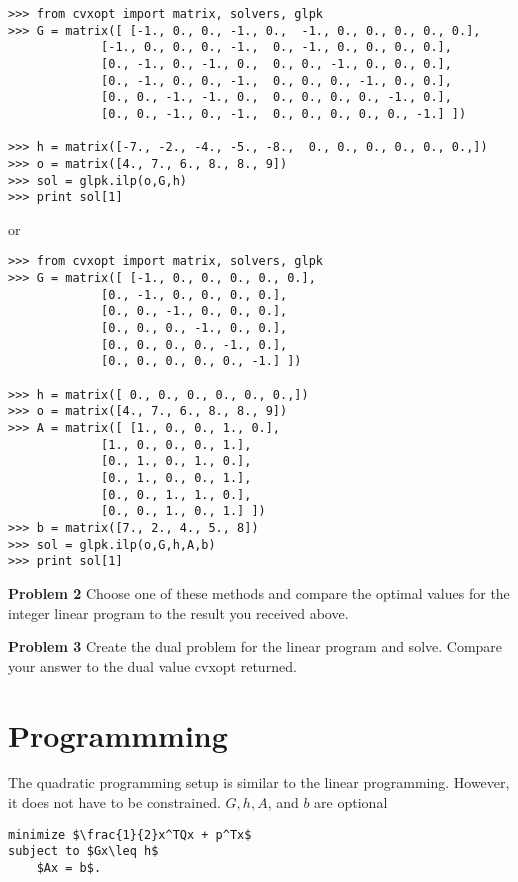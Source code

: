 \begin{lstlisting}
>>> from cvxopt import matrix, solvers, glpk
>>> G = matrix([ [-1., 0., 0., -1., 0.,  -1., 0., 0., 0., 0., 0.],
             [-1., 0., 0., 0., -1.,  0., -1., 0., 0., 0., 0.],
             [0., -1., 0., -1., 0.,  0., 0., -1., 0., 0., 0.],
             [0., -1., 0., 0., -1.,  0., 0., 0., -1., 0., 0.],
             [0., 0., -1., -1., 0.,  0., 0., 0., 0., -1., 0.],
             [0., 0., -1., 0., -1.,  0., 0., 0., 0., 0., -1.] ])

>>> h = matrix([-7., -2., -4., -5., -8.,  0., 0., 0., 0., 0., 0.,])
>>> o = matrix([4., 7., 6., 8., 8., 9])
>>> sol = glpk.ilp(o,G,h)
>>> print sol[1]
\end{lstlisting} 

or 
\begin{lstlisting}
>>> from cvxopt import matrix, solvers, glpk
>>> G = matrix([ [-1., 0., 0., 0., 0., 0.],
             [0., -1., 0., 0., 0., 0.],
             [0., 0., -1., 0., 0., 0.],
             [0., 0., 0., -1., 0., 0.],
             [0., 0., 0., 0., -1., 0.],
             [0., 0., 0., 0., 0., -1.] ])

>>> h = matrix([ 0., 0., 0., 0., 0., 0.,])
>>> o = matrix([4., 7., 6., 8., 8., 9])
>>> A = matrix([ [1., 0., 0., 1., 0.],
             [1., 0., 0., 0., 1.],
             [0., 1., 0., 1., 0.],
             [0., 1., 0., 0., 1.],
             [0., 0., 1., 1., 0.],
             [0., 0., 1., 0., 1.] ])
>>> b = matrix([7., 2., 4., 5., 8])
>>> sol = glpk.ilp(o,G,h,A,b)
>>> print sol[1]
\end{lstlisting} 

\textbf{Problem 2}
Choose one of these methods and compare the optimal values for the integer linear program to the result you received above. 

\textbf{Problem 3}
Create the dual problem for the linear program and solve. 
Compare your answer to the dual value cvxopt returned. 

\section*{Programmming}

The quadratic programming setup is similar to the linear programming.
However, it does not have to be constrained.
$G, h, A$, and $b$ are optional

\begin{lstlisting}[mathescape]
minimize $\frac{1}{2}x^TQx + p^Tx$
subject to $Gx\leq h$
	$Ax = b$.
\end{lstlisting}


